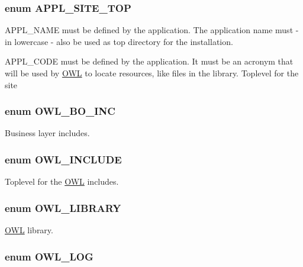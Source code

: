 \subsubsection[{APPL\_\-SITE\_\-TOP}]{\setlength{\rightskip}{0pt plus 5cm}enum {\bf APPL\_\-SITE\_\-TOP}}\label{OWLloader_8php_a17a0c6fb6eda7d05081d16bc519c97b5}


APPL\_\-NAME must be defined by the application. The application name must -\/ in lowercase -\/ also be used as top directory for the installation. 

APPL\_\-CODE must be defined by the application. It must be an acronym that will be used by \hyperlink{classOWL}{OWL} to locate resources, like files in the library. Toplevel for the site 
\subsubsection[{OWL\_\-BO\_\-INC}]{\setlength{\rightskip}{0pt plus 5cm}enum {\bf OWL\_\-BO\_\-INC}}\label{OWLloader_8php_aca50646bc73c3addf0e0f25081eae0ae}


Business layer includes. 

\subsubsection[{OWL\_\-INCLUDE}]{\setlength{\rightskip}{0pt plus 5cm}enum {\bf OWL\_\-INCLUDE}}\label{OWLloader_8php_a4d33a8f2fcc9c83cbeea921c4cb23a7f}


Toplevel for the \hyperlink{classOWL}{OWL} includes. 

\subsubsection[{OWL\_\-LIBRARY}]{\setlength{\rightskip}{0pt plus 5cm}enum {\bf OWL\_\-LIBRARY}}\label{OWLloader_8php_a74eed08508c8b70677c4167acf49e427}


\hyperlink{classOWL}{OWL} library. 

\subsubsection[{OWL\_\-LOG}]{\setlength{\rightskip}{0pt plus 5cm}enum {\bf OWL\_\-LOG}}\label{OWLloader_8php_ae3fe8a897196b3cb98b8827a9a940ccb}


